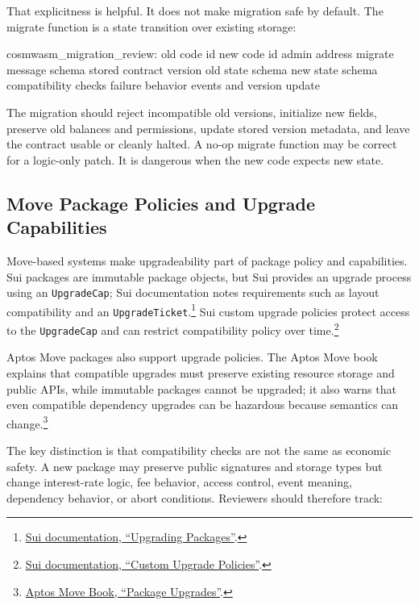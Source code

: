 That explicitness is helpful. It does not make migration safe by default. The migrate function is a state transition over existing storage:

\begin{codeblock}
cosmwasm_migration_review:
    old code id
    new code id
    admin address
    migrate message schema
    stored contract version
    old state schema
    new state schema
    compatibility checks
    failure behavior
    events and version update
\end{codeblock}

The migration should reject incompatible old versions, initialize new fields, preserve old balances and permissions, update stored version metadata, and leave the contract usable or cleanly halted. A no-op migrate function may be correct for a logic-only patch. It is dangerous when the new code expects new state.

\subsection{Move Package Policies and Upgrade Capabilities}

Move-based systems make upgradeability part of package policy and capabilities. Sui packages are immutable package objects, but Sui provides an upgrade process using an \texttt{UpgradeCap}; Sui documentation notes requirements such as layout compatibility and an \texttt{UpgradeTicket}.\footnote{\href{https://docs.sui.io/develop/publish-upgrade-packages/upgrade}{Sui documentation, ``Upgrading Packages''}.} Sui custom upgrade policies protect access to the \texttt{UpgradeCap} and can restrict compatibility policy over time.\footnote{\href{https://docs.sui.io/develop/publish-upgrade-packages/custom-policies}{Sui documentation, ``Custom Upgrade Policies''}.}

Aptos Move packages also support upgrade policies. The Aptos Move book explains that compatible upgrades must preserve existing resource storage and public APIs, while immutable packages cannot be upgraded; it also warns that even compatible dependency upgrades can be hazardous because semantics can change.\footnote{\href{https://aptos-labs.github.io/move-book/modules-and-packages.html\#package-upgrades}{Aptos Move Book, ``Package Upgrades''}.}

The key distinction is that compatibility checks are not the same as economic safety. A new package may preserve public signatures and storage types but change interest-rate logic, fee behavior, access control, event meaning, dependency behavior, or abort conditions. Reviewers should therefore track:

